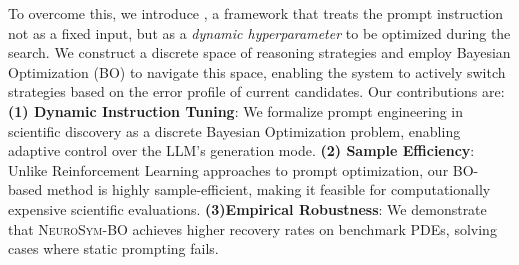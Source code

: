 To overcome this, we introduce \ours, a framework that treats the prompt instruction not as a fixed input, but as a \textit{dynamic hyperparameter} to be optimized during the search. We construct a discrete space of reasoning strategies and employ Bayesian Optimization (BO) to navigate this space, enabling the system to actively switch strategies based on the error profile of current candidates. Our contributions are: \textbf{(1) Dynamic Instruction Tuning}: We formalize prompt engineering in scientific discovery as a discrete Bayesian Optimization problem, enabling adaptive control over the LLM's generation mode. \textbf{(2) Sample Efficiency}: Unlike Reinforcement Learning approaches to prompt optimization, our BO-based method is highly sample-efficient, making it feasible for computationally expensive scientific evaluations. \textbf{(3)Empirical Robustness}: We demonstrate that \textsc{NeuroSym-BO} achieves higher recovery rates on benchmark PDEs, solving cases where static prompting fails.

